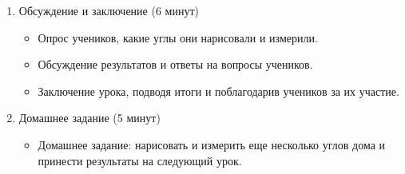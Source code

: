 \documentclass[a4paper,12pt]{article}
\begin{document}
\begin{enumerate}
\item Обсуждение и заключение (6 минут)
	\begin{itemize}
	\item Опрос учеников, какие углы они нарисовали и измерили.
	\item Обсуждение результатов и ответы на вопросы учеников.
	\item Заключение урока, подводя итоги и поблагодарив учеников за их участие.
	\end{itemize}

\item Домашнее задание (5 минут)
	\begin{itemize}
	\item Домашнее задание: нарисовать и измерить еще несколько углов дома и принести результаты на следующий урок.
	\end{itemize}
\end{enumerate}
\end{document}
